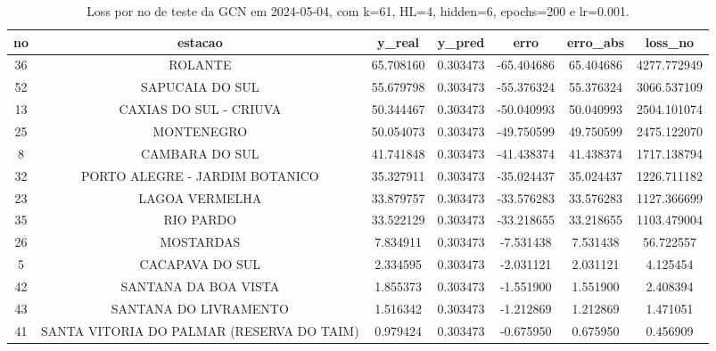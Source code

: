 \begin{table}[h]
\centering
\caption{Loss por no de teste da GCN em 2024-05-04, com k=61, HL=4, hidden=6, epochs=200 e lr=0.001.}
\label{tab:gcn_loss_k61_hl4_h6_e200_d20240504}
\begin{tabular}{ccccccc}
\toprule
no & estacao & y\_real & y\_pred & erro & erro\_abs & loss\_no \\
\midrule
36 & ROLANTE & 65.708160 & 0.303473 & -65.404686 & 65.404686 & 4277.772949 \\
52 & SAPUCAIA DO SUL & 55.679798 & 0.303473 & -55.376324 & 55.376324 & 3066.537109 \\
13 & CAXIAS DO SUL - CRIUVA & 50.344467 & 0.303473 & -50.040993 & 50.040993 & 2504.101074 \\
25 & MONTENEGRO & 50.054073 & 0.303473 & -49.750599 & 49.750599 & 2475.122070 \\
8 & CAMBARA DO SUL & 41.741848 & 0.303473 & -41.438374 & 41.438374 & 1717.138794 \\
32 & PORTO ALEGRE - JARDIM BOTANICO & 35.327911 & 0.303473 & -35.024437 & 35.024437 & 1226.711182 \\
23 & LAGOA VERMELHA & 33.879757 & 0.303473 & -33.576283 & 33.576283 & 1127.366699 \\
35 & RIO PARDO & 33.522129 & 0.303473 & -33.218655 & 33.218655 & 1103.479004 \\
26 & MOSTARDAS & 7.834911 & 0.303473 & -7.531438 & 7.531438 & 56.722557 \\
5 & CACAPAVA DO SUL & 2.334595 & 0.303473 & -2.031121 & 2.031121 & 4.125454 \\
42 & SANTANA DA BOA VISTA & 1.855373 & 0.303473 & -1.551900 & 1.551900 & 2.408394 \\
43 & SANTANA DO LIVRAMENTO & 1.516342 & 0.303473 & -1.212869 & 1.212869 & 1.471051 \\
41 & SANTA VITORIA DO PALMAR (RESERVA DO TAIM) & 0.979424 & 0.303473 & -0.675950 & 0.675950 & 0.456909 \\
\bottomrule
\end{tabular}
\end{table}

